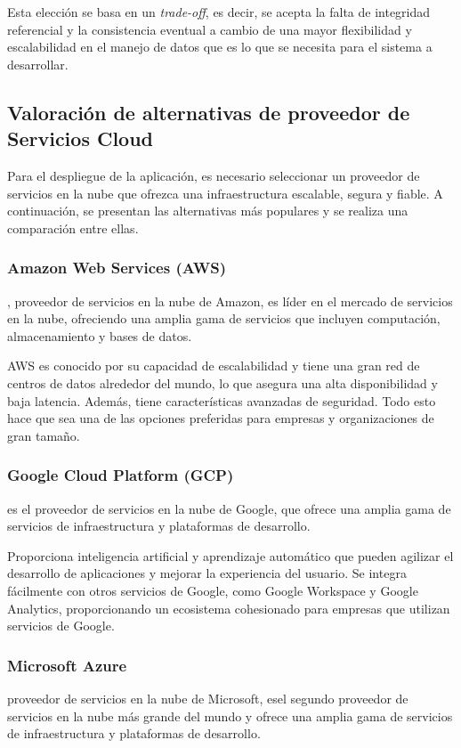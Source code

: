 Esta elección se basa en un \textit{trade-off}, es decir, se acepta la falta de integridad referencial y la consistencia eventual a cambio de una mayor flexibilidad y escalabilidad en el manejo de datos que es lo que se necesita para el sistema a desarrollar.


\subsection{Valoración de alternativas de proveedor de Servicios Cloud}
Para el despliegue de la aplicación, es necesario seleccionar un proveedor de servicios en la nube que ofrezca una infraestructura escalable, segura y fiable. 
A continuación, se presentan las alternativas más populares y se realiza una comparación entre ellas.


\subsubsection{Amazon Web Services (AWS)}
, proveedor de servicios en la nube de Amazon, es líder en el mercado de servicios en la nube, ofreciendo una amplia gama de servicios 
que incluyen computación, almacenamiento y bases de datos. 

AWS es conocido por su capacidad de escalabilidad y tiene una gran red de centros de datos alrededor del mundo, 
lo que asegura una alta disponibilidad y baja latencia.  
Además, tiene características avanzadas de seguridad.
Todo esto hace que sea una de las opciones preferidas para empresas y organizaciones de gran tamaño.

\subsubsection{Google Cloud Platform (GCP)}
  es el proveedor de servicios en la nube de Google, que ofrece una amplia gama de servicios de infraestructura y plataformas de desarrollo.

Proporciona inteligencia artificial y aprendizaje automático que pueden agilizar el desarrollo de aplicaciones y mejorar la experiencia del usuario.
Se integra fácilmente con otros servicios de Google, como Google Workspace y Google Analytics, proporcionando un ecosistema cohesionado para empresas que utilizan servicios de Google.


\subsubsection{Microsoft Azure}
 proveedor de servicios en la nube de Microsoft, esel segundo proveedor de servicios en la nube más grande del mundo 
y ofrece una amplia gama de servicios de infraestructura y plataformas de desarrollo.


